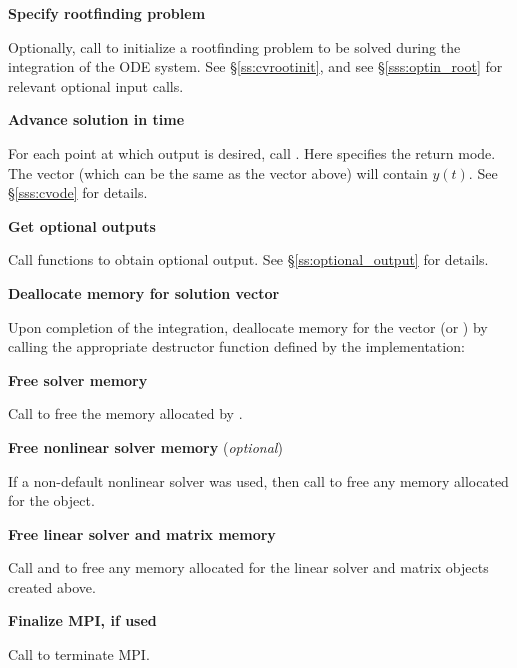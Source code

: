 \begin{Steps}
\item
  {\bf Specify rootfinding problem}

  Optionally, call  to initialize a rootfinding problem
  to be solved during the integration of the ODE system.
  See \S\ref{ss:cvrootinit}, and see \S\ref{sss:optin_root} for
  relevant optional input calls.

\item
  {\bf Advance solution in time}

  For each point at which output is desired, call
  .
  Here  specifies the return mode.
  The vector  (which can be the same as
  the vector  above) will contain $y(t)$.
  See \S\ref{sss:cvode} for details.

\item
  {\bf Get optional outputs}

  Call  functions to obtain optional output.
  See \S\ref{ss:optional_output} for details.

\item
  {\bf Deallocate memory for solution vector}

  Upon completion of the integration, deallocate memory for the vector 
  (or ) by calling the appropriate destructor function defined by the
  {\nvector} implementation:


\item
  {\bf Free solver memory}

  Call  to free the memory allocated by {\cvodes}.

\item
  {\bf Free nonlinear solver memory} (\textit{optional})

  If a non-default nonlinear solver was used, then call
   to free any memory allocated for the
  {\sunnonlinsol} object.

\item
  {\bf Free linear solver and matrix memory}

  Call  and  to free any memory
  allocated for the linear solver and matrix objects created above.

\item
  {\bf Finalize MPI, if used}

  Call  to terminate MPI.

\end{Steps}


